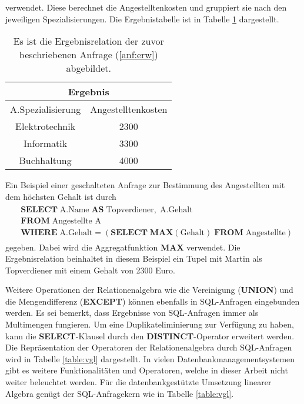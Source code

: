 verwendet. Diese berechnet die Angestelltenkosten und gruppiert sie nach den jeweiligen Spezialisierungen. Die Ergebnistabelle ist in Tabelle \ref{abb:erg_erw} dargestellt.
\begin{table}[h]
    \centering
\begin{tabular}{|c|c|} \hline
    \multicolumn{2}{|c|}{\textbf{Ergebnis}} \\ \hline
    \hline
    A.Spezialisierung &Angestelltenkosten\\ 
    \hline
    Elektrotechnik &2300 \\ 
    \hline
    Informatik &3300\\
    \hline
    Buchhaltung &4000\\ 
    \hline
\end{tabular}
\caption[Ergebnisrelation einer zweiten SQL-Anfrage]{Es ist die Ergebnisrelation der zuvor beschriebenen Anfrage (\ref{anf:erw})
\label{abb:erg_erw} abgebildet.}
\end{table}
Ein Beispiel einer geschalteten Anfrage zur Bestimmung des Angestellten mit dem höchsten Gehalt ist durch
\begin{align}
    \label{anf:schachtel}
    \begin{split}
        & \mathbf{SELECT} \; \text{A.Name}\;  \mathbf{AS} \; \text{Topverdiener},\; \text{A.Gehalt}\\
        & \mathbf{FROM} \; \text{Angestellte A} \\
        &\mathbf{WHERE} \; \text{A.Gehalt}=(\mathbf{SELECT}\; \mathbf{MAX}(\text{Gehalt}) \; \mathbf{FROM}\; \text{Angestellte})
    \end{split}
\end{align}
gegeben. Dabei wird die Aggregatfunktion \textbf{MAX} verwendet. Die Ergebnisrelation beinhaltet in diesem Beispiel ein Tupel mit Martin als Topverdiener mit einem Gehalt von 2300 Euro.

Weitere Operationen der Relationenalgebra wie die Vereinigung (\textbf{UNION}) und die Mengendifferenz (\textbf{EXCEPT}) können ebenfalls in SQL-Anfragen eingebunden werden. Es sei bemerkt, dass Ergebnisse von SQL-Anfragen immer als Multimengen fungieren. Um eine Duplikateliminierung zur Verfügung zu haben, kann die \textbf{SELECT}-Klausel durch den \textbf{DISTINCT}-Operator erweitert werden. Die Repräsentation der Operatoren der Relationenalgebra durch SQL-Anfragen wird in Tabelle \ref{table:vgl} dargestellt. In vielen Datenbankmanagementsystemen gibt es weitere Funktionalitäten und Operatoren, welche in dieser Arbeit nicht weiter beleuchtet werden. Für die datenbankgestützte Umsetzung linearer Algebra genügt der SQL-Anfragekern wie in Tabelle \ref{table:vgl}.

